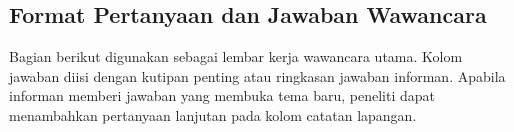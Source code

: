 \clearpage
\subsection*{Format Pertanyaan dan Jawaban Wawancara}

Bagian berikut digunakan sebagai lembar kerja wawancara utama. Kolom jawaban diisi dengan kutipan penting atau ringkasan jawaban informan. Apabila informan memberi jawaban yang membuka tema baru, peneliti dapat menambahkan pertanyaan lanjutan pada kolom catatan lapangan.

\newcommand{\InterviewAnswerSpace}{\vspace{0.9cm}}
\newcommand{\InterviewLongtableCaption}[2]{%
    \refstepcounter{table}%
    \label{#1}%
    \addcontentsline{lot}{table}{\protect\numberline{\thetable}#2}%
    \begin{center}
        \footnotesize\bfseries
        Tabel \thetable\\
        #2
    \end{center}
}

